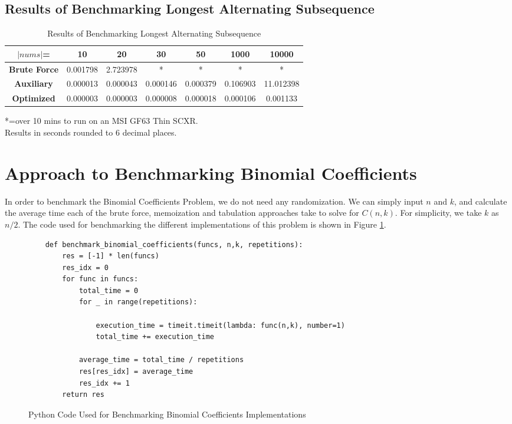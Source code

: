 \subsection{Results of Benchmarking Longest Alternating Subsequence}
\begin{table}[H]
    \centering
    \begin{tabular}{|c|c|c|c|c|c|c|}
        \hline
        \textbf{$|nums|$=}  & \textbf{10} & \textbf{20} & \textbf{30} & \textbf{50} & \textbf{1000}  & \textbf{10000} \\
        \hline
        \textbf{Brute Force} & 0.001798 & 2.723978 & * & * & * & * \\
        \hline
        \textbf{Auxiliary} & 0.000013 & 0.000043 & 0.000146 & 0.000379 & 0.106903 & 11.012398 \\
        \hline
        \textbf{Optimized} &  0.000003 & 0.000003 & 0.000008 & 0.000018 & 0.000106 & 0.001133 \\
        \hline
    \end{tabular}
    \caption{Results of Benchmarking Longest Alternating Subsequence}
\end{table}
*=over 10 mins to run on an MSI GF63 Thin SCXR.\\
Results in seconds rounded to 6 decimal places.
\newpage

\section{Approach to Benchmarking Binomial Coefficients}
In order to benchmark the Binomial Coefficients Problem, we do not need any randomization. We can simply input $n$ and $k$, and calculate the average time each of the brute force, memoization and tabulation approaches take to solve for $C(n,k)$.
For simplicity, we take $k$ as $n/2$.
The code used for benchmarking the different implementations of this problem is shown in Figure \ref{fig:bm-binomial}.

\begin{figure}[H]
    \centering
    \begin{lstlisting}
    def benchmark_binomial_coefficients(funcs, n,k, repetitions):
        res = [-1] * len(funcs)
        res_idx = 0
        for func in funcs:
            total_time = 0
            for _ in range(repetitions):
    
                execution_time = timeit.timeit(lambda: func(n,k), number=1)
                total_time += execution_time
    
            average_time = total_time / repetitions
            res[res_idx] = average_time
            res_idx += 1
        return res
    \end{lstlisting}
    \caption{Python Code Used for Benchmarking Binomial Coefficients Implementations}
    \label{fig:bm-binomial}
\end{figure}

